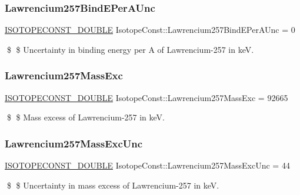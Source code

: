 \subsubsection{\texorpdfstring{Lawrencium257\+Bind\+E\+Per\+A\+Unc}{Lawrencium257BindEPerAUnc}}
{\footnotesize\ttfamily \mbox{\hyperlink{group___isotope_const-_macros_ga8f45a7272ce02c0b4c65c44636ed719a}{I\+S\+O\+T\+O\+P\+E\+C\+O\+N\+S\+T\+\_\+\+D\+O\+U\+B\+LE}} Isotope\+Const\+::\+Lawrencium257\+Bind\+E\+Per\+A\+Unc = 0}

\$ \$ Uncertainty in binding energy per A of Lawrencium-\/257 in keV. \mbox{\label{group___isotope_const-_lawrencium-_lr257_ga3d4cb011111b721f66afb1791045abea}} 
\subsubsection{\texorpdfstring{Lawrencium257\+Mass\+Exc}{Lawrencium257MassExc}}
{\footnotesize\ttfamily \mbox{\hyperlink{group___isotope_const-_macros_ga8f45a7272ce02c0b4c65c44636ed719a}{I\+S\+O\+T\+O\+P\+E\+C\+O\+N\+S\+T\+\_\+\+D\+O\+U\+B\+LE}} Isotope\+Const\+::\+Lawrencium257\+Mass\+Exc = 92665}

\$ \$ Mass excess of Lawrencium-\/257 in keV. \mbox{\label{group___isotope_const-_lawrencium-_lr257_gaec7ad65f73c6d15a25688763d69747c7}} 
\subsubsection{\texorpdfstring{Lawrencium257\+Mass\+Exc\+Unc}{Lawrencium257MassExcUnc}}
{\footnotesize\ttfamily \mbox{\hyperlink{group___isotope_const-_macros_ga8f45a7272ce02c0b4c65c44636ed719a}{I\+S\+O\+T\+O\+P\+E\+C\+O\+N\+S\+T\+\_\+\+D\+O\+U\+B\+LE}} Isotope\+Const\+::\+Lawrencium257\+Mass\+Exc\+Unc = 44}

\$ \$ Uncertainty in mass excess of Lawrencium-\/257 in keV. \mbox{\label{group___isotope_const-_lawrencium-_lr257_ga2e244267a931fbea1b2344edc663ceb8}} 

